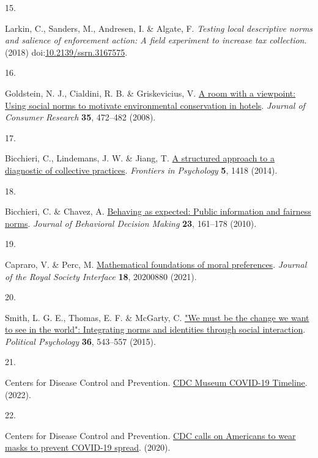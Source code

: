 \documentclass[
  man, donotrepeattitle,floatsintext]{apa6}
\newlength{\cslhangindent}
\newlength{\csllabelwidth}
\newlength{\cslentryspacingunit} %
\newenvironment{CSLReferences}[2] %
 {%
  \setlength{\parindent}{0pt}
  \ifodd #1
  \let\oldpar\par
  \def\par{\hangindent=\cslhangindent\oldpar}
  \fi
  \setlength{\parskip}{#2\cslentryspacingunit}
 }%
 {}
\newcommand{\CSLLeftMargin}[1]{\parbox[t]{\csllabelwidth}{#1}}
\newcommand{\CSLRightInline}[1]{\parbox[t]{\linewidth - \csllabelwidth}{#1}\break}
\begin{document}
\begin{CSLReferences}{0}{0}
\leavevmode{}%
\CSLLeftMargin{15. }%
\CSLRightInline{Larkin, C., Sanders, M., Andresen, I. \& Algate, F. \emph{Testing local descriptive norms and salience of enforcement action: A field experiment to increase tax collection}. (2018) doi:\href{https://doi.org/10.2139/ssrn.3167575}{10.2139/ssrn.3167575}.}

\leavevmode{}%
\CSLLeftMargin{16. }%
\CSLRightInline{Goldstein, N. J., Cialdini, R. B. \& Griskevicius, V. \href{https://doi.org/10.1086/586910}{A room with a viewpoint: Using social norms to motivate environmental conservation in hotels}. \emph{Journal of Consumer Research} \textbf{35}, 472--482 (2008).}

\leavevmode{}%
\CSLLeftMargin{17. }%
\CSLRightInline{Bicchieri, C., Lindemans, J. W. \& Jiang, T. \href{https://doi.org/10.3389/fpsyg.2014.01418}{A structured approach to a diagnostic of collective practices}. \emph{Frontiers in Psychology} \textbf{5}, 1418 (2014).}

\leavevmode{}%
\CSLLeftMargin{18. }%
\CSLRightInline{Bicchieri, C. \& Chavez, A. \href{https://doi.org/10.1002/bdm.648}{Behaving as expected: Public information and fairness norms}. \emph{Journal of Behavioral Decision Making} \textbf{23}, 161--178 (2010).}

\leavevmode{}%
\CSLLeftMargin{19. }%
\CSLRightInline{Capraro, V. \& Perc, M. \href{https://doi.org/10.1098/rsif.2020.0880}{Mathematical foundations of moral preferences}. \emph{Journal of the Royal Society Interface} \textbf{18}, 20200880 (2021).}

\leavevmode{}%
\CSLLeftMargin{20. }%
\CSLRightInline{Smith, L. G. E., Thomas, E. F. \& McGarty, C. \href{https://doi.org/10.1111/pops.12180}{"We must be the change we want to see in the world": Integrating norms and identities through social interaction}. \emph{Political Psychology} \textbf{36}, 543--557 (2015).}

\leavevmode{}%
\CSLLeftMargin{21. }%
\CSLRightInline{Centers for Disease Control and Prevention. \href{https://www.cdc.gov/museum/timeline/covid19.html}{{CDC Museum COVID-19 Timeline}}. (2022).}

\leavevmode{}%
\CSLLeftMargin{22. }%
\CSLRightInline{Centers for Disease Control and Prevention. \href{https://www.cdc.gov/media/releases/2020/p0714-americans-to-wear-masks.html}{{CDC calls on Americans to wear masks to prevent COVID-19 spread}}. (2020).}


\end{CSLReferences}
\end{document}
